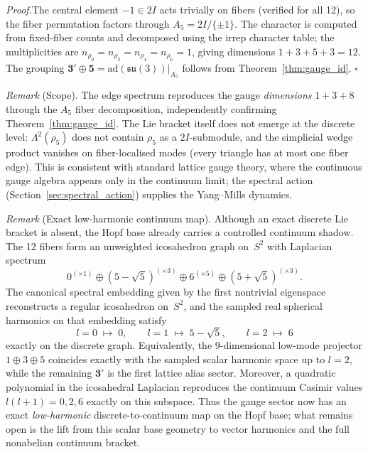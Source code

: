 \documentclass[12pt,a4paper]{article}
\theoremstyle{definition}
\begin{document}
\noindent\textit{Proof.}\enspace The central element $-1 \in 2I$ acts trivially on fibers (verified for all 12), so the fiber permutation factors through $A_5 = 2I/\{\pm 1\}$.  The character is computed from fixed-fiber counts and decomposed using the irrep character table; the multiplicities are $n_{\rho_0} = n_{\rho_2} = n_{\rho_4} = n_{\rho_6} = 1$, giving dimensions $1 + 3 + 5 + 3 = 12$.  The grouping $\mathbf{3'} \oplus \mathbf{5} = \mathrm{ad}(\mathfrak{su}(3))|_{A_5}$ follows from Theorem~\ref{thm:gauge_id}.  \hfill$\square$

\smallskip

\noindent\textit{Remark} (Scope).  The edge spectrum reproduces the gauge \emph{dimensions} $1 + 3 + 8$ through the $A_5$ fiber decomposition, independently confirming Theorem~\ref{thm:gauge_id}.  The Lie bracket itself does not emerge at the discrete level: $\Lambda^2(\rho_5)$ does not contain $\rho_5$ as a $2I$-submodule, and the simplicial wedge product vanishes on fiber-localised modes (every triangle has at most one fiber edge).  This is consistent with standard lattice gauge theory, where the continuous gauge algebra appears only in the continuum limit; the spectral action (Section~\ref{sec:spectral_action}) supplies the Yang--Mills dynamics.

\noindent\textit{Remark} (Exact low-harmonic continuum map).  Although an exact discrete Lie bracket is absent, the Hopf base already carries a controlled continuum shadow.  The 12 fibers form an unweighted icosahedron graph on~$S^2$ with Laplacian spectrum
\[
0^{(\times 1)} \oplus (5-\sqrt{5})^{(\times 3)} \oplus 6^{(\times 5)} \oplus (5+\sqrt{5})^{(\times 3)}.
\]
The canonical spectral embedding given by the first nontrivial eigenspace reconstructs a regular icosahedron on~$S^2$, and the sampled real spherical harmonics on that embedding satisfy
\[
l=0 \;\mapsto\; 0, \qquad l=1 \;\mapsto\; 5-\sqrt{5}, \qquad l=2 \;\mapsto\; 6
\]
exactly on the discrete graph.  Equivalently, the $9$-dimensional low-mode projector $1 \oplus 3 \oplus 5$ coincides exactly with the sampled scalar harmonic space up to $l=2$, while the remaining $\mathbf{3'}$ is the first lattice alias sector.  Moreover, a quadratic polynomial in the icosahedral Laplacian reproduces the continuum Casimir values $l(l+1)=0,2,6$ exactly on this subspace.  Thus the gauge sector now has an exact \emph{low-harmonic} discrete-to-continuum map on the Hopf base; what remains open is the lift from this scalar base geometry to vector harmonics and the full nonabelian continuum bracket.
\end{document}
